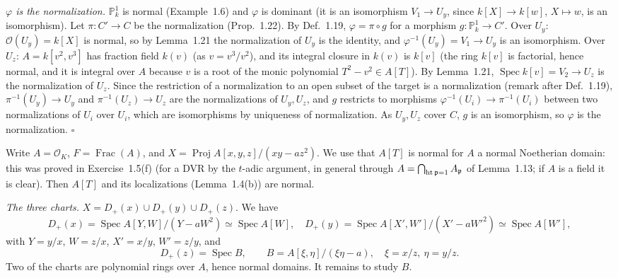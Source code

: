 \documentclass[11pt]{article}
\begin{document}
\emph{$\varphi$ is the normalization.} $\mathbb P^1_k$ is normal (Example~1.6) and $\varphi$ is dominant (it is an isomorphism $V_1\to U_y$, since $k[X]\to k[w]$, $X\mapsto w$, is an isomorphism). Let $\pi:C'\to C$ be the normalization (Prop.~1.22). By Def.~1.19, $\varphi=\pi\circ g$ for a morphism $g:\mathbb P^1_k\to C'$. Over $U_y$: $\mathcal O(U_y)=k[X]$ is normal, so by Lemma~1.21 the normalization of $U_y$ is the identity, and $\varphi^{-1}(U_y)=V_1\to U_y$ is an isomorphism. Over $U_z$: $A=k[v^2,v^3]$ has fraction field $k(v)$ (as $v=v^3/v^2$), and its integral closure in $k(v)$ is $k[v]$ (the ring $k[v]$ is factorial, hence normal, and it is integral over $A$ because $v$ is a root of the monic polynomial $T^2-v^2\in A[T]$). By Lemma~1.21, $\operatorname{Spec}k[v]=V_2\to U_z$ is the normalization of $U_z$. Since the restriction of a normalization to an open subset of the target is a normalization (remark after Def.~1.19), $\pi^{-1}(U_y)\to U_y$ and $\pi^{-1}(U_z)\to U_z$ are the normalizations of $U_y,U_z$, and $g$ restricts to morphisms $\varphi^{-1}(U_i)\to\pi^{-1}(U_i)$ between two normalizations of $U_i$ over $U_i$, which are isomorphisms by uniqueness of normalization. As $U_y,U_z$ cover $C$, $g$ is an isomorphism, so $\varphi$ is the normalization. \hfill$\square$

\pf
Write $A=\mathcal O_K$, $F=\operatorname{Frac}(A)$, and $X=\operatorname{Proj}A[x,y,z]/(xy-az^2)$. We use that $A[T]$ is normal for $A$ a normal Noetherian domain: this was proved in Exercise~1.5(f) (for a DVR by the $t$-adic argument, in general through $A=\bigcap_{\operatorname{ht}\mathfrak p=1}A_\mathfrak p$ of Lemma~1.13; if $A$ is a field it is clear). Then $A[T]$ and its localizations (Lemma~1.4(b)) are normal.

\emph{The three charts.} $X=D_+(x)\cup D_+(y)\cup D_+(z)$. We have
\[ D_+(x)=\operatorname{Spec}A[Y,W]/(Y-aW^2)\simeq\operatorname{Spec}A[W],\quad D_+(y)=\operatorname{Spec}A[X',W']/(X'-aW'^2)\simeq\operatorname{Spec}A[W'], \]
with $Y=y/x$, $W=z/x$, $X'=x/y$, $W'=z/y$, and
\[ D_+(z)=\operatorname{Spec}B,\qquad B=A[\xi,\eta]/(\xi\eta-a),\quad \xi=x/z,\ \eta=y/z. \]
Two of the charts are polynomial rings over $A$, hence normal domains. It remains to study $B$.
\end{document}
